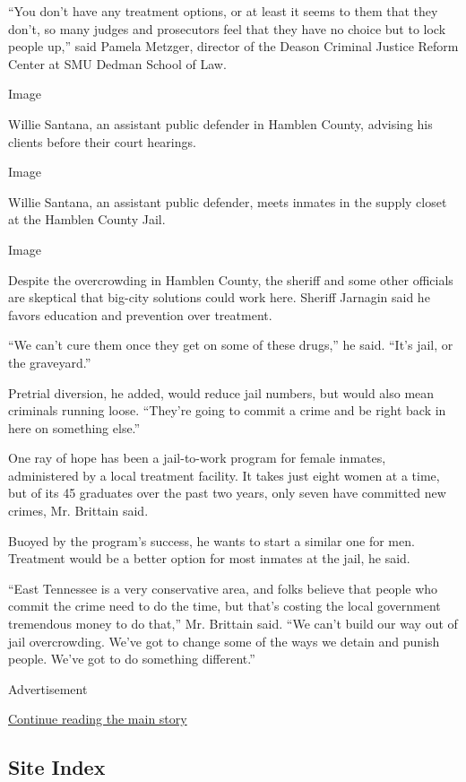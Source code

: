 ``You don't have any treatment options, or at least it seems to them
that they don't, so many judges and prosecutors feel that they have no
choice but to lock people up,'' said Pamela Metzger, director of the
Deason Criminal Justice Reform Center at SMU Dedman School of Law.

Image

Willie Santana, an assistant public defender in Hamblen County, advising
his clients before their court hearings.

Image

Willie Santana, an assistant public defender, meets inmates in the
supply closet at the Hamblen County Jail.

Image

Despite the overcrowding in Hamblen County, the sheriff and some other
officials are skeptical that big-city solutions could work here. Sheriff
Jarnagin said he favors education and prevention over treatment.

``We can't cure them once they get on some of these drugs,'' he said.
``It's jail, or the graveyard.''

Pretrial diversion, he added, would reduce jail numbers, but would also
mean criminals running loose. ``They're going to commit a crime and be
right back in here on something else.''

One ray of hope has been a jail-to-work program for female inmates,
administered by a local treatment facility. It takes just eight women at
a time, but of its 45 graduates over the past two years, only seven have
committed new crimes, Mr. Brittain said.

Buoyed by the program's success, he wants to start a similar one for
men. Treatment would be a better option for most inmates at the jail, he
said.

``East Tennessee is a very conservative area, and folks believe that
people who commit the crime need to do the time, but that's costing the
local government tremendous money to do that,'' Mr. Brittain said. ``We
can't build our way out of jail overcrowding. We've got to change some
of the ways we detain and punish people. We've got to do something
different.''

Advertisement

\protect\hyperlink{after-bottom}{Continue reading the main story}

\hypertarget{site-index}{%
\subsection{Site Index}\label{site-index}}

